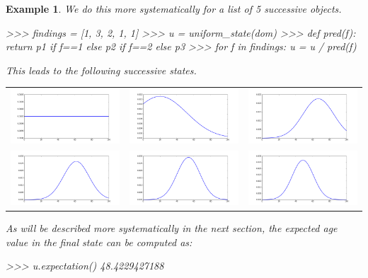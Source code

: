 \documentclass[leqno]{tufte-book} %
\newtheorem{example}[theorem]{Example}
\begin{document}
\begin{example}
We do this more systematically for a list of 5 successive objects.
\begin{python}
>>> findings = [1, 3, 2, 1, 1]
>>> u = uniform_state(dom)
>>> def pred(f): return p1 if f==1 else p2 if f==2 else p3
>>> for f in findings: u = u / pred(f)
\end{python}

This leads to the following successive states.
\begin{center}
\begin{tabular}{ccc}
\includegraphics[width=15em]{Pictures/tomb_state-0.png} 
&
\includegraphics[width=15em]{Pictures/tomb_state-1.png} 
&
\includegraphics[width=15em]{Pictures/tomb_state-2.png} 
\\
\includegraphics[width=15em]{Pictures/tomb_state-3.png} 
&
\includegraphics[width=15em]{Pictures/tomb_state-4.png} 
&
\includegraphics[width=15em]{Pictures/tomb_state-5.png} 
\end{tabular}
\end{center}

\noindent As will be described more systematically in the next section,
the expected age value in the final state can be computed as:
\begin{python}
>>> u.expectation()
48.4229427188
\end{python}
\end{example}
\end{document}
